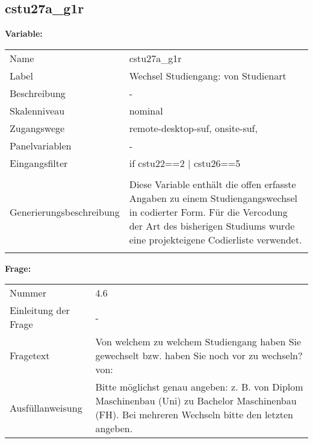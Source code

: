 	
	
	\subsection{cstu27a\_g1r}
	\label{subSection:cstu27a_g1r}

	\noindent\textbf{Variable:}\\
		\begin{tabular}{lL{11.3cm}}
			\label{tableVariable:cstu27a_g1r}
			Name & cstu27a\_g1r \\
			Label & Wechsel Studiengang: von Studienart \\
			Beschreibung & - \\
			Skalenniveau & nominal \\
			Zugangswege &
				remote-desktop-suf,
				onsite-suf,
 \\
			Panelvariablen & -
			 \\
			Eingangsfilter & if cstu22==2 | cstu26==5 \\
 \\
					Generierungsbeschreibung & Diese Variable enthält die offen erfasste Angaben zu einem Studiengangswechsel in codierter Form. Für die Vercodung der Art des bisherigen Studiums wurde eine projekteigene Codierliste verwendet.
				 \\	
			 \\
		\end{tabular}

		\vspace*{1 cm}
		\noindent\textbf{Frage:}\\
		\begin{tabular}{lL{11.3cm}}
			\label{tableQuestion:cstu27a_g1r}
			Nummer & 4.6 \\
			Einleitung der Frage & - \\
			Fragetext & Von welchem zu welchem Studiengang haben Sie gewechselt bzw. haben Sie noch vor zu wechseln?
von: \\
			Ausfüllanweisung & Bitte möglichst genau angeben: z. B. von Diplom Maschinenbau
(Uni) zu Bachelor Maschinenbau (FH).
Bei mehreren Wechseln bitte den letzten angeben. \\
		\end{tabular}






